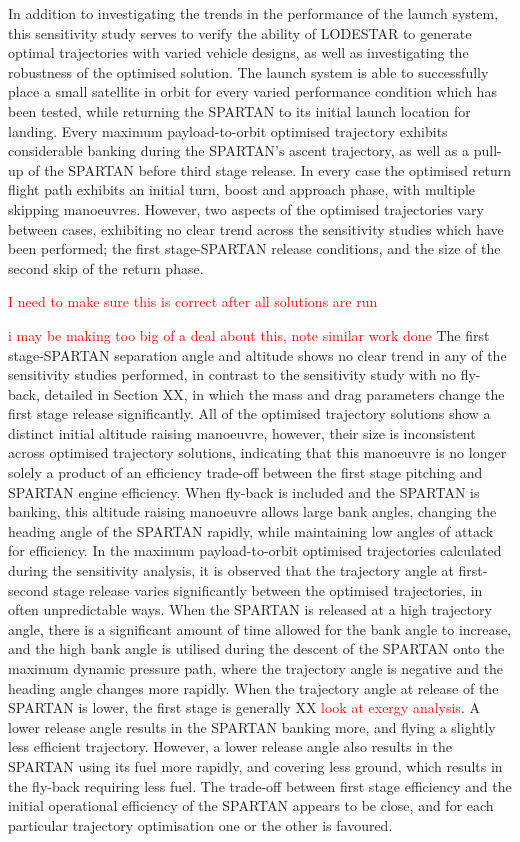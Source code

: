 In addition to investigating the trends in the performance of the launch system, this sensitivity study serves to verify the ability of LODESTAR to generate optimal trajectories with varied vehicle designs, as well as investigating the robustness of the optimised solution.
The launch system is able to successfully place a small satellite in orbit for every varied performance condition which has been tested, while returning the SPARTAN to its initial launch location for landing. 
Every maximum payload-to-orbit optimised trajectory exhibits considerable banking during the SPARTAN's ascent trajectory, as well as a pull-up of the SPARTAN before third stage release. 
In every case the optimised return flight path exhibits an initial turn, boost and approach phase, with multiple skipping manoeuvres. 
However, two aspects of the optimised trajectories vary between cases, exhibiting no clear trend across the sensitivity studies which have been performed; the first stage-SPARTAN release conditions, and the size of the second skip of the return phase. 

\textcolor{red}{I need to make sure this is correct after all solutions are run}

\textcolor{red}{i may be making too big of a deal about this, note similar work done}
The first stage-SPARTAN separation angle and altitude shows no clear trend in any of the sensitivity studies performed, in contrast to the sensitivity study with no fly-back, detailed in Section XX, in which the mass and drag parameters change the first stage release significantly. All of the optimised trajectory solutions show a distinct initial altitude raising manoeuvre, however, their size is inconsistent across optimised trajectory solutions, indicating that this manoeuvre is no longer solely a product of an efficiency trade-off between the first stage pitching and SPARTAN engine efficiency. When fly-back is included and the SPARTAN is banking, this altitude raising manoeuvre allows large bank angles, changing the heading angle of the SPARTAN rapidly, while maintaining low angles of attack for efficiency. 
In the maximum payload-to-orbit optimised trajectories calculated during the sensitivity analysis, it is observed that the trajectory angle at first-second stage release varies significantly between the optimised trajectories, in often unpredictable ways. When the SPARTAN is released at a high trajectory angle, there is a significant amount of time allowed for the bank angle to increase, and the high bank angle is utilised during the descent of the SPARTAN onto the maximum dynamic pressure path, where the trajectory angle is negative and the heading angle changes more rapidly. 
When the trajectory angle at release of the SPARTAN is lower, the first stage is generally XX \textcolor{red}{look at exergy analysis}. A lower release angle results in the SPARTAN banking more, and flying a slightly less efficient trajectory. However, a lower release angle also results in the SPARTAN using its fuel more rapidly, and covering less ground, which results in the fly-back requiring less fuel. 
The trade-off between first stage efficiency and the initial operational efficiency of the SPARTAN appears to be close, and 
for each particular trajectory optimisation one or the other is favoured. 


